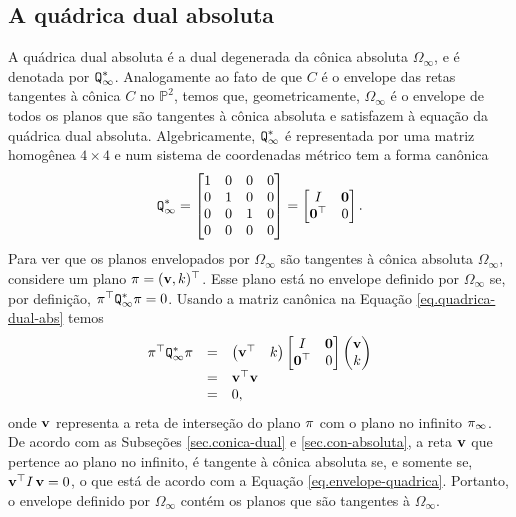\subsection{A quádrica dual absoluta}\label{sec.quadrica-dual-abs}
A quádrica dual absoluta é a dual degenerada da cônica absoluta $\Omega_\infty$, e é denotada por 
${\tt Q}^*_\infty$. Analogamente ao fato de que $C$ é o envelope das retas tangentes à cônica $C$ no ${\mathbb{P}}^2$, temos que, geometricamente, $\Omega_\infty$ é o envelope de todos os planos que são tangentes à cônica absoluta e satisfazem à equação da quádrica dual absoluta. Algebricamente, 
${\tt Q}^*_\infty$ é representada por uma matriz homogênea $4\times4$ e num sistema de coordenadas métrico tem a forma canônica
\begin{equation}\label{eq.quadrica-dual-abs}
{\tt Q}^*_\infty=
\begin{bmatrix}
1&0&0&0\\
0&1&0&0\\
0&0&1&0\\
0&0&0&0
\end{bmatrix}=
\begin{bmatrix}
I&{\bf 0}\\
{\bf 0}^\top&0
\end{bmatrix}.
\end{equation}
Para ver que os planos envelopados por $\Omega_\infty$ são tangentes à cônica absoluta $\Omega_\infty$, considere um plano $\pi=({\bf v}, k)^\top$. Esse plano está no envelope definido por $\Omega_\infty$ se, por definição, $\pi^\top {\tt Q}^*_\infty\pi=0$. Usando a matriz canônica na Equação \ref{eq.quadrica-dual-abs} temos
\begin{equation}\label{eq.envelope-quadrica}
\begin{array}{rcl}
\pi^\top {\tt Q}^*_\infty\pi&=&
\begin{pmatrix}
{\bf v}^\top&k
\end{pmatrix}
\begin{bmatrix}
I&{\bf 0}\\
{\bf 0}^\top&0
\end{bmatrix}
\begin{pmatrix}
{\bf v}\\
k
\end{pmatrix}\\
&=&{\bf v}^\top {\bf v}\\
&=&0,
\end{array}
\end{equation}
onde ${\bf v}$ representa a reta de interseção do plano $\pi$ com o plano no infinito $\pi_\infty$. De acordo com as Subseções \ref{sec.conica-dual} e \ref{sec.con-absoluta}, a reta ${\bf v}$ que pertence ao plano no infinito, é tangente à cônica absoluta se, e somente se, ${\bf v}^\top I\,{\bf v}=0$, o que está de acordo com a Equação \ref{eq.envelope-quadrica}. Portanto, o envelope definido por $\Omega_\infty$ contém os planos que são tangentes à $\Omega_\infty$. 

